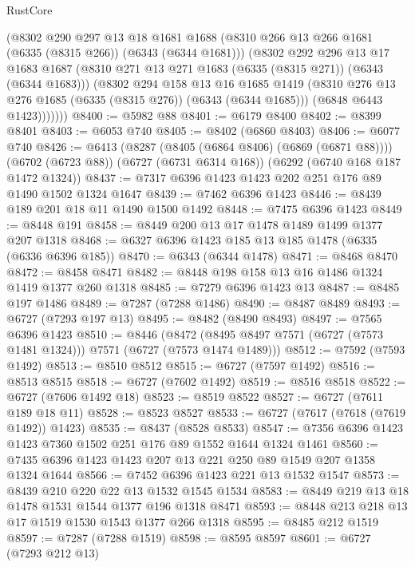 \begin{lexlean}{RustCore}
\begin{coremodule}
          (@8302
            @290
            @297
            @13
            @18
            @1681
            @1688
            (@8310 @266 @13 @266 @1681 (@6335 (@8315 @266)) (@6343 (@6344 @1681)))
            (@8302
              @292
              @296
              @13
              @17
              @1683
              @1687
              (@8310 @271 @13 @271 @1683 (@6335 (@8315 @271)) (@6343 (@6344 @1683)))
              (@8302
                @294
                @158
                @13
                @16
                @1685
                @1419
                (@8310 @276 @13 @276 @1685 (@6335 (@8315 @276)) (@6343 (@6344 @1685)))
                (@6848 @6443 @1423)))))))
@8400 := @5982 @88
@8401 := @6179 @8400
@8402 := @8399 @8401
@8403 := @6053 @740
@8405 := @8402 (@6860 @8403)
@8406 := @6077 @740
@8426 := @6413
    (@8287 (@8405 (@6864 @8406) (@6869 (@6871 @88))))
    (@6702 (@6723 @88))
    (@6727 (@6731 @6314 @168))
    (@6292 (@6740 @168 @187 @1472 @1324))
@8437 := @7317 @6396 @1423 @1423 @202 @251 @176 @89 @1490 @1502 @1324 @1647
@8439 := @7462 @6396 @1423
@8446 := @8439 @189 @201 @18 @11 @1490 @1500 @1492
@8448 := @7475 @6396 @1423
@8449 := @8448 @191
@8458 := @8449 @200 @13 @17 @1478 @1489 @1499 @1377 @207 @1318
@8468 := @6327 @6396 @1423 @185 @13 @185 @1478 (@6335 (@6336 @6396 @185))
@8470 := @6343 (@6344 @1478)
@8471 := @8468 @8470
@8472 := @8458 @8471
@8482 := @8448 @198 @158 @13 @16 @1486 @1324 @1419 @1377 @260 @1318
@8485 := @7279 @6396 @1423 @13
@8487 := @8485 @197 @1486
@8489 := @7287 (@7288 @1486)
@8490 := @8487 @8489
@8493 := @6727 (@7293 @197 @13)
@8495 := @8482 (@8490 @8493)
@8497 := @7565 @6396 @1423
@8510 := @8446
    (@8472 (@8495 @8497 @7571 (@6727 (@7573 @1481 @1324))) @7571 (@6727 (@7573 @1474 @1489)))
@8512 := @7592 (@7593 @1492)
@8513 := @8510 @8512
@8515 := @6727 (@7597 @1492)
@8516 := @8513 @8515
@8518 := @6727 (@7602 @1492)
@8519 := @8516 @8518
@8522 := @6727 (@7606 @1492 @18)
@8523 := @8519 @8522
@8527 := @6727 (@7611 @189 @18 @11)
@8528 := @8523 @8527
@8533 := @6727 (@7617 (@7618 (@7619 @1492)) @1423)
@8535 := @8437 (@8528 @8533)
@8547 := @7356 @6396 @1423 @1423 @7360 @1502 @251 @176 @89 @1552 @1644 @1324 @1461
@8560 := @7435 @6396 @1423 @1423 @207 @13 @221 @250 @89 @1549 @207 @1358 @1324 @1644
@8566 := @7452 @6396 @1423 @221 @13 @1532 @1547
@8573 := @8439 @210 @220 @22 @13 @1532 @1545 @1534
@8583 := @8449 @219 @13 @18 @1478 @1531 @1544 @1377 @196 @1318 @8471
@8593 := @8448 @213 @218 @13 @17 @1519 @1530 @1543 @1377 @266 @1318
@8595 := @8485 @212 @1519
@8597 := @7287 (@7288 @1519)
@8598 := @8595 @8597
@8601 := @6727 (@7293 @212 @13)

\end{coremodule}
\end{lexlean}
